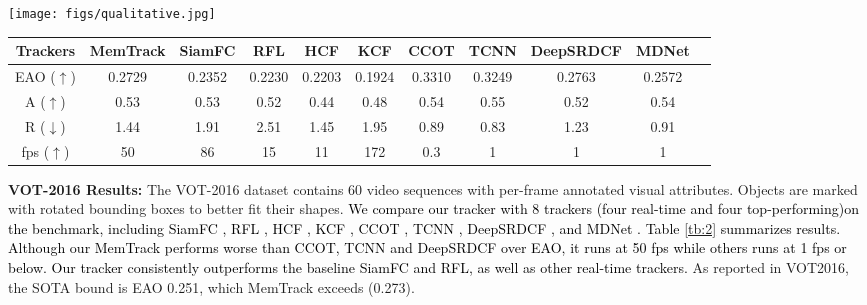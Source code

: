 \documentclass[runningheads]{llncs}
\newcommand{\ty}[1]{\textcolor{black}{#1}}
\newcommand{\tyy}[1]{\textcolor{black}{#1}}
\begin{document}
\begin{figure*}[t]
	\begin{center}
		\texttt{[image: figs/qualitative.jpg]}
	\end{center}
	\caption{Qualitative results of our MemTrack, along with  SiamFC \cite{Bertinetto2016}, RFL \cite{Yang2017}, CFNet \cite{Valmadre2017},  Staple \cite{Bertinetto2016-1}, LMCF \cite{Wang2017}, ACFN \cite{Choi2017} on eight challenge sequences. From left to right, top to bottom: \textit{board, bolt2, dragonbaby, lemming, matrix, skiing, biker, girl2}.}
	\label{fig:12}
\end{figure*}

\begin{table*}
	\small
	\begin{center}
		\begin{tabular}{cccccc|ccccc}
			\hline 
			Trackers & MemTrack & SiamFC & RFL & HCF& KCF & CCOT &TCNN & DeepSRDCF & MDNet \\
			\hline
			EAO ($\uparrow$) & 0.2729 & 0.2352 & 0.2230 &0.2203 & 0.1924&  0.3310 & 0.3249 & 0.2763 &0.2572\\
			A ($\uparrow$) & 0.53 & 0.53  &0.52 &0.44 & 0.48 &  0.54 & 0.55 &0.52  & 0.54\\
			R ($\downarrow$) & 1.44 & 1.91 &2.51 &1.45 &1.95 &  0.89 & 0.83 & 1.23 & 0.91\\
			fps ($\uparrow$) & 50 & 86 & 15& 11& 172&  0.3 & 1 & 1 & 1 \\
			\hline
		\end{tabular} 
	\end{center}
	\caption{Comparison results on VOT-2016 with top performers. The evaluation metrics include expected average overlap (EAO), accuracy and robustness value (A and R), accuracy and robustness rank (Ar and Rr). Best results are bolded, and second best is underlined. The up arrows indicate higher values are better for that metric, while down arrows mean lower values are better.}
	\label{tb:2}
\end{table*}
	

\textbf{VOT-2016 Results:} The VOT-2016 dataset contains 60 video sequences with per-frame annotated visual attributes. Objects are marked with rotated bounding boxes to better fit their shapes. \ty{We compare our tracker with 8 trackers (four real-time and four top-performing)on the benchmark, including SiamFC \cite{Bertinetto2016}, RFL \cite{Yang2017},   HCF \cite{Ma2015}, KCF \cite{Henriques2015},  CCOT \cite{Danelljan2016-1}, TCNN \cite{Nam2016-1}, DeepSRDCF \cite{Danelljan2016-2}, and MDNet \cite{Nam2016}.
Table \ref{tb:2} summarizes results. Although our MemTrack performs worse than \tyy{CCOT, TCNN and DeepSRDCF over EAO}, it runs at 50 fps while others runs at 1 fps or below. Our tracker consistently outperforms the baseline SiamFC and RFL, as well as other real-time trackers.} As reported
in VOT2016, the SOTA bound is EAO 0.251, which
MemTrack exceeds (0.273).
\end{document}
